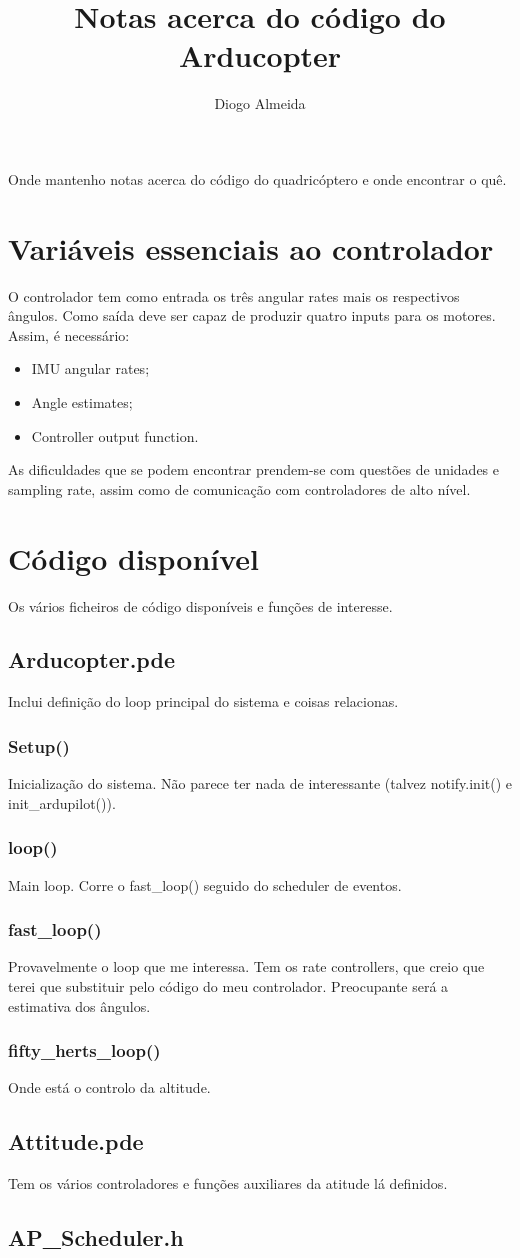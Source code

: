 \documentclass{article}
\begin{document}
	\title{Notas acerca do código do Arducopter}
	\author{Diogo Almeida}
	\maketitle	
	Onde mantenho notas acerca do código do quadricóptero e onde encontrar o quê.
	
	\section{Variáveis essenciais ao controlador}
		O controlador tem como entrada os três angular rates mais os respectivos ângulos. Como saída deve ser capaz de produzir quatro inputs para os motores. Assim, é necessário:
		\begin{itemize}
			\item IMU angular rates;
			\item Angle estimates;
			\item Controller output function.
		\end{itemize}
	
	As dificuldades que se podem encontrar prendem-se com questões de unidades e sampling rate, assim como de comunicação com controladores de alto nível.
	
	\section{Código disponível}
	Os vários ficheiros de código disponíveis e funções de interesse.
		\subsection{Arducopter.pde}
			Inclui definição do loop principal do sistema e coisas relacionas.
			\subsubsection{Setup()}
				Inicialização do sistema. Não parece ter nada de interessante (talvez notify.init() e init\_ardupilot()).
			\subsubsection{loop()}
				Main loop. Corre o fast\_loop() seguido do scheduler de eventos.
			\subsubsection{fast\_loop()}
				Provavelmente o loop que me interessa. Tem os rate controllers, que creio que terei que substituir pelo código do meu controlador. Preocupante será a estimativa dos ângulos.
			\subsubsection{fifty\_herts\_loop()}
				Onde está o controlo da altitude.
		\subsection{Attitude.pde}
			Tem os vários controladores e funções auxiliares da atitude lá definidos.
		\subsection{AP_Scheduler.h}
			
	
	
\end{document}
